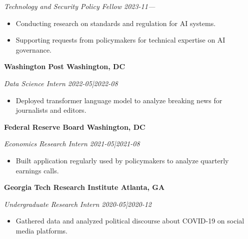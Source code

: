 \documentclass{article}
\newcommand{\headingTwo}[2]{
    \vspace*{6pt}
    \textbf{#1 \hfill #2}
}
\newcommand{\headingThree}[2]{
    \vspace*{2pt}
    \textsl{#1 \hfill #2}
}
\begin{document}
\headingThree{Technology and Security Policy Fellow}{2023-11—}
\begin{itemize}
    \item Conducting research on standards and regulation for AI systems.
    \item Supporting requests from policymakers for technical expertise on AI governance.
\end{itemize}





\headingTwo{Washington Post}{Washington, DC}

\headingThree{Data Science Intern}{2022-05|2022-08}
\begin{itemize}
    \item Deployed transformer language model to analyze breaking news for journalists and editors.
\end{itemize}


\headingTwo{Federal Reserve Board}{Washington, DC}

\headingThree{Economics Research Intern}{2021-05|2021-08}
\begin{itemize}
    \item Built application regularly used by policymakers to analyze quarterly earnings calls.
\end{itemize}


\headingTwo{Georgia Tech Research Institute}{Atlanta, GA}

\headingThree{Undergraduate Research Intern}{2020-05|2020-12}
\begin{itemize}
    \item Gathered data and analyzed political discourse about COVID-19 on social media platforms.
\end{itemize}
\end{document}

